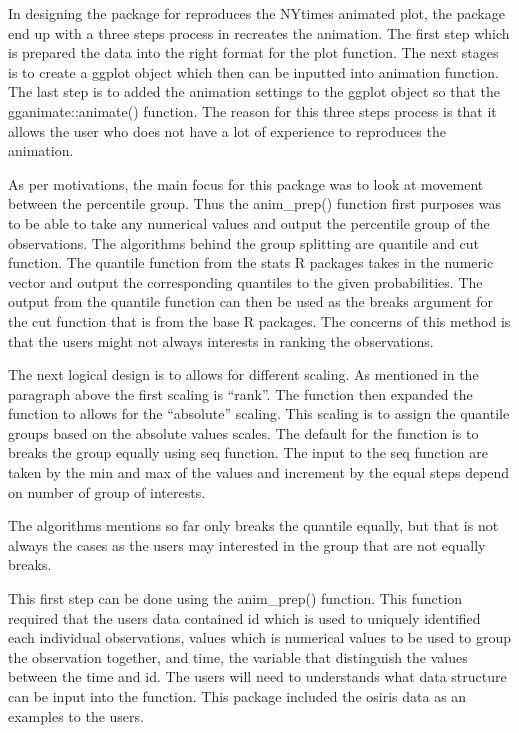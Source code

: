 In designing the package for reproduces the NYtimes animated plot, the package end up with a three steps process in recreates the animation. The first step which is prepared the data into the right format for the plot function. The next stages is to create a ggplot object which then can be inputted into animation function. The last step is to added the animation settings to the ggplot object so that the gganimate::animate() function. The reason for this three steps process is that it allows the user who does not have a lot of experience to reproduces the animation.

As per motivations, the main focus for this package was to look at movement between the percentile group. Thus the anim\_prep() function first purposes was to be able to take any numerical values and output the percentile group of the observations. The algorithms behind the group splitting are quantile and cut function. The quantile function from the stats R packages takes in the numeric vector and output the corresponding quantiles to the given probabilities. The output from the quantile function can then be used as the breaks argument for the cut function that is from the base R packages. The concerns of this method is that the users might not always interests in ranking the observations.

The next logical design is to allows for different scaling. As mentioned in the paragraph above the first scaling is ``rank''. The function then expanded the function to allows for the ``absolute'' scaling. This scaling is to assign the quantile groups based on the absolute values scales. The default for the function is to breaks the group equally using seq function. The input to the seq function are taken by the min and max of the values and increment by the equal steps depend on number of group of interests.

The algorithms mentions so far only breaks the quantile equally, but that is not always the cases as the users may interested in the group that are not equally breaks.

This first step can be done using the anim\_prep() function. This function required that the users data contained id which is used to uniquely identified each individual observations, values which is numerical values to be used to group the observation together, and time, the variable that distinguish the values between the time and id. The users will need to understands what data structure can be input into the function. This package included the osiris data as an examples to the users.

